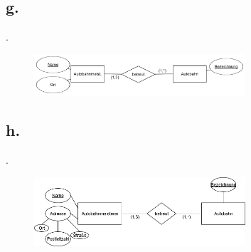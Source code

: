\documentclass{article}
\begin{document}
	
	\pagebreak
	
	\subsection*{g.}
	.
	\begin{figure}[h]
		\includegraphics[width=0.7\textwidth]{aufgabe_1_2_g.png}
	\end{figure}
	
	\subsection*{h.}
	.
	\begin{figure}[h]
		\includegraphics[width=0.7\textwidth]{aufgabe_1_2_h.png}
	\end{figure}
	
\end{document}
